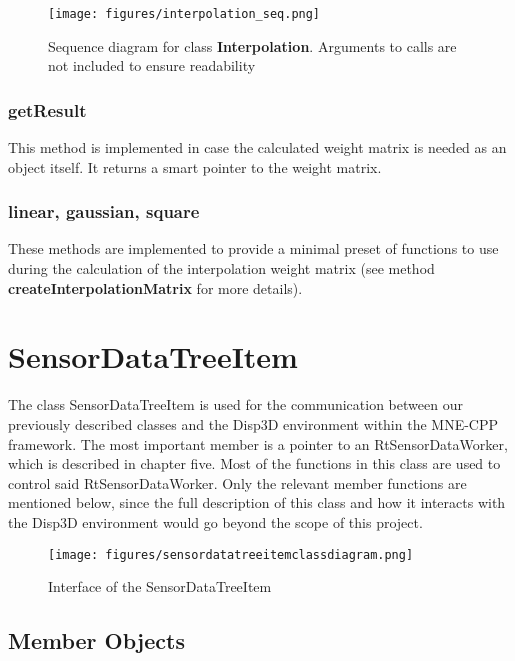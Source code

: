 \begin{figure}[h]
	\begin{center}
		\texttt{[image: figures/interpolation\_seq.png]}
		\caption{Sequence diagram for class \textbf{Interpolation}. Arguments to calls are not included to ensure readability}
	\end{center}
\end{figure}

\subsubsection{getResult}
This method is implemented in case the calculated weight matrix is needed as an object itself. It returns a smart pointer to the weight matrix.

\subsubsection{linear, gaussian, square}
These methods are implemented to provide a minimal preset of functions to use during the calculation of the interpolation weight matrix (see method \textbf{createInterpolationMatrix} for more details).

\clearpage

\section{SensorDataTreeItem}

The class SensorDataTreeItem is used for the communication between our previously described classes and the Disp3D environment within the MNE-CPP framework. The most important member is a pointer to an RtSensorDataWorker, which is described in chapter five. Most of the functions in this class are used to control said RtSensorDataWorker. Only the relevant member functions are mentioned below, since the full description of this class and how it interacts with the Disp3D environment would go beyond the scope of this project.

\begin{figure}[h]
	\begin{center}
		\texttt{[image: figures/sensordatatreeitemclassdiagram.png]}
		\caption{Interface of the SensorDataTreeItem}
	\end{center}
\end{figure}

\subsection{Member Objects}

